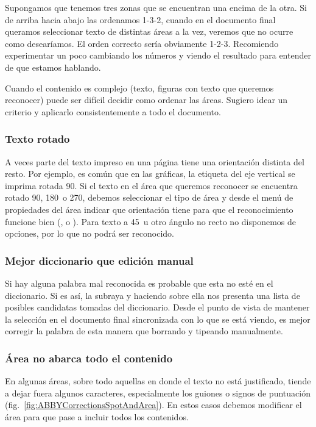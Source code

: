 \documentclass[%
	a5paper,
	10pt,
	twoside,
	openright,
	final,
]{memoir}
\begin{document}
	Supongamos que tenemos tres zonas que se encuentran una encima de la otra. Si de arriba hacia abajo las ordenamos 1-3-2, cuando en el documento final queramos seleccionar texto de distintas áreas a la vez, veremos que no ocurre como desearíamos. El orden correcto sería obviamente 1-2-3. Recomiendo experimentar un poco cambiando los números y viendo el resultado para entender de que estamos hablando.

	Cuando el contenido es complejo (texto, figuras con texto que queremos reconocer) puede ser difícil decidir como ordenar las áreas. Sugiero idear un criterio y aplicarlo consistentemente a todo el documento.

	\subsubsection{Texto rotado} A veces parte del texto impreso en una página tiene una orientación distinta del resto. Por ejemplo, es común que en las gráficas, la etiqueta del eje vertical se imprima rotada 90\textdegree. Si el texto en el área que queremos reconocer se encuentra rotado 90\textdegree, 180\textdegree\ o 270\textdegree, debemos seleccionar el tipo de área  y desde el menú de propiedades del área indicar que orientación tiene para que el reconocimiento funcione bien (,  o ). Para texto a 45\textdegree\ u otro ángulo no recto no disponemos de opciones, por lo que no podrá ser reconocido.

	\subsubsection{Mejor diccionario que edición manual} Si hay alguna palabra mal reconocida es probable que esta no esté en el diccionario. Si es así, \abby la subraya y haciendo \keys{\rightclick} sobre ella nos presenta una lista de posibles candidatas tomadas del diccionario. Desde el punto de vista de mantener la selección en el documento final sincronizada con lo que se está viendo, es mejor corregir la palabra de esta manera que borrando y tipeando manualmente.

	\subsubsection{Área no abarca todo el contenido} En algunas áreas, sobre todo aquellas en donde el texto no está justificado, \abby tiende a dejar fuera algunos caracteres, especialmente los guiones o signos de puntuación (fig.~\ref{fig:ABBYCorrectionsSpotAndArea}). En estos casos debemos modificar el área para que pase a incluir todos los contenidos.
\end{document}
